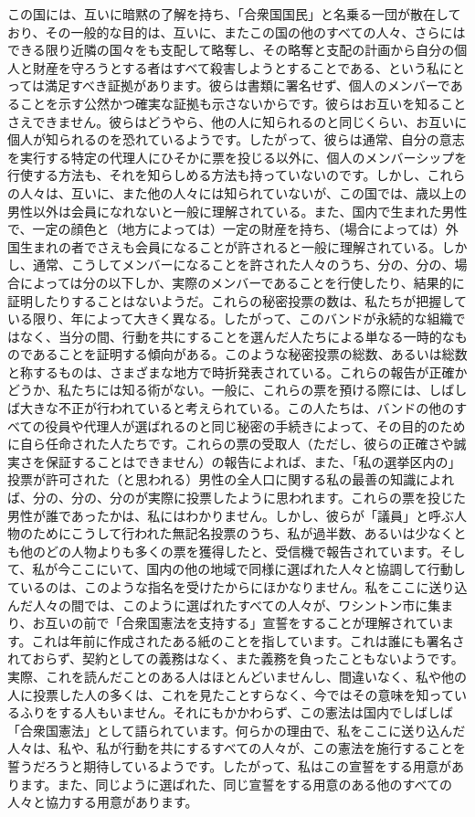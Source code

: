 \documentclass[dvipdfmx, uplatex, tate, landscape]{utbook}
\begin{document}
この国には、互いに暗黙の了解を持ち、「合衆国国民」と名乗る一団が散在しており、その一般的な目的は、互いに、またこの国の他のすべての人々、さらにはできる限り近隣の国々をも支配して略奪し、その略奪と支配の計画から自分の個人と財産を守ろうとする者はすべて殺害しようとすることである、という私にとっては満足すべき証拠があります。彼らは書類に署名せず、個人のメンバーであることを示す公然かつ確実な証拠も示さないからです。彼らはお互いを知ることさえできません。彼らはどうやら、他の人に知られるのと同じくらい、お互いに個人が知られるのを恐れているようです。したがって、彼らは通常、自分の意志を実行する特定の代理人にひそかに票を投じる以外に、個人のメンバーシップを行使する方法も、それを知らしめる方法も持っていないのです。しかし、これらの人々は、互いに、また他の人々には知られていないが、この国では、歳以上の男性以外は会員になれないと一般に理解されている。また、国内で生まれた男性で、一定の顔色と（地方によっては）一定の財産を持ち、（場合によっては）外国生まれの者でさえも会員になることが許されると一般に理解されている。しかし、通常、こうしてメンバーになることを許された人々のうち、分の、分の、場合によっては分の以下しか、実際のメンバーであることを行使したり、結果的に証明したりすることはないようだ。これらの秘密投票の数は、私たちが把握している限り、年によって大きく異なる。したがって、このバンドが永続的な組織ではなく、当分の間、行動を共にすることを選んだ人たちによる単なる一時的なものであることを証明する傾向がある。このような秘密投票の総数、あるいは総数と称するものは、さまざまな地方で時折発表されている。これらの報告が正確かどうか、私たちには知る術がない。一般に、これらの票を預ける際には、しばしば大きな不正が行われていると考えられている。この人たちは、バンドの他のすべての役員や代理人が選ばれるのと同じ秘密の手続きによって、その目的のために自ら任命された人たちです。これらの票の受取人（ただし、彼らの正確さや誠実さを保証することはできません）の報告によれば、また、「私の選挙区内の」投票が許可された（と思われる）男性の全人口に関する私の最善の知識によれば、分の、分の、分のが実際に投票したように思われます。これらの票を投じた男性が誰であったかは、私にはわかりません。しかし、彼らが「議員」と呼ぶ人物のためにこうして行われた無記名投票のうち、私が過半数、あるいは少なくとも他のどの人物よりも多くの票を獲得したと、受信機で報告されています。そして、私が今ここにいて、国内の他の地域で同様に選ばれた人々と協調して行動しているのは、このような指名を受けたからにほかなりません。私をここに送り込んだ人々の間では、このように選ばれたすべての人々が、ワシントン市に集まり、お互いの前で「合衆国憲法を支持する」宣誓をすることが理解されています。これは年前に作成されたある紙のことを指しています。これは誰にも署名されておらず、契約としての義務はなく、また義務を負ったこともないようです。実際、これを読んだことのある人はほとんどいませんし、間違いなく、私や他の人に投票した人の多くは、これを見たことすらなく、今ではその意味を知っているふりをする人もいません。それにもかかわらず、この憲法は国内でしばしば「合衆国憲法」として語られています。何らかの理由で、私をここに送り込んだ人々は、私や、私が行動を共にするすべての人々が、この憲法を施行することを誓うだろうと期待しているようです。したがって、私はこの宣誓をする用意があります。また、同じように選ばれた、同じ宣誓をする用意のある他のすべての人々と協力する用意があります。
\end{document}
